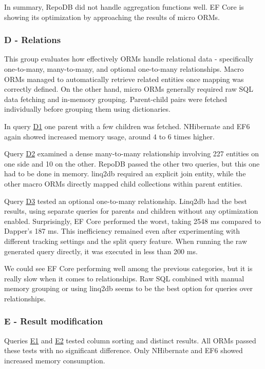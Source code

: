 In summary, RepoDB did not handle aggregation functions well. EF Core is showing its optimization by approaching the results of micro ORMs.

\subsubsection{D - Relations}
This group evaluates how effectively ORMs handle relational data - specifically one-to-many, many-to-many, and optional one-to-many relationships. Macro ORMs managed to automatically retrieve related entities once mapping was correctly defined. On the other hand, micro ORMs generally required raw SQL data fetching and in-memory grouping. Parent-child pairs were fetched individually before grouping them using dictionaries.

In query \hyperref[query:d1]{D1} one parent with a few children was fetched. NHibernate and EF6 again showed increased memory usage, around 4 to 6 times higher.

Query \hyperref[query:d2]{D2} examined a dense many-to-many relationship involving 227 entities on one side and 10 on the other. RepoDB passed the other two queries, but this one had to be done in memory. linq2db required an explicit join entity, while the other macro ORMs directly mapped child collections within parent entities.

Query \hyperref[query:d3]{D3} tested an optional one-to-many relationship. Linq2db had the best results, using separate queries for parents and children without any optimization enabled. Surprisingly, EF Core performed the worst, taking 2548 ms compared to Dapper's 187 ms. This inefficiency remained even after experimenting with different tracking settings and the split query feature. When running the raw generated query directly, it was executed in less than 200 ms.

We could see EF Core performing well among the previous categories, but it is really slow when it comes to relationships. Raw SQL combined with manual memory grouping or using linq2db seems to be the best option for queries over relationships.

\subsubsection{E - Result modification}
Queries \hyperref[query:e1]{E1} and \hyperref[query:e2]{E2} tested column sorting and distinct results. All ORMs passed these tests with no significant difference. Only NHibernate and EF6 showed increased memory consumption. 

